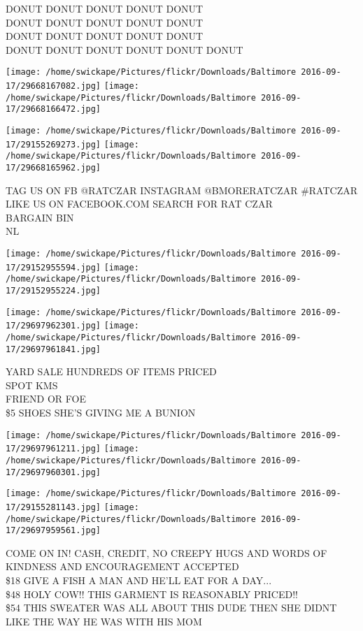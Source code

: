 \documentclass[10pt,letterpaper]{article}
\begin{document}
DONUT DONUT DONUT DONUT DONUT\\
DONUT DONUT DONUT DONUT DONUT\\
DONUT DONUT DONUT DONUT DONUT\\
DONUT DONUT DONUT DONUT DONUT DONUT\\
\pagebreak

\texttt{[image: /home/swickape/Pictures/flickr/Downloads/Baltimore 2016-09-17/29668167082.jpg]}
\texttt{[image: /home/swickape/Pictures/flickr/Downloads/Baltimore 2016-09-17/29668166472.jpg]}

\texttt{[image: /home/swickape/Pictures/flickr/Downloads/Baltimore 2016-09-17/29155269273.jpg]}
\texttt{[image: /home/swickape/Pictures/flickr/Downloads/Baltimore 2016-09-17/29668165962.jpg]}

TAG US ON FB @RATCZAR INSTAGRAM @BMORERATCZAR \#RATCZAR\\
LIKE US ON FACEBOOK.COM SEARCH FOR RAT CZAR\\
BARGAIN BIN\\
NL\\
\pagebreak

\texttt{[image: /home/swickape/Pictures/flickr/Downloads/Baltimore 2016-09-17/29152955594.jpg]}
\texttt{[image: /home/swickape/Pictures/flickr/Downloads/Baltimore 2016-09-17/29152955224.jpg]}

\texttt{[image: /home/swickape/Pictures/flickr/Downloads/Baltimore 2016-09-17/29697962301.jpg]}
\texttt{[image: /home/swickape/Pictures/flickr/Downloads/Baltimore 2016-09-17/29697961841.jpg]}

YARD SALE HUNDREDS OF ITEMS PRICED\\
SPOT KMS\\
FRIEND OR FOE\\
\$5 SHOES SHE'S GIVING ME A BUNION\\
\pagebreak

\texttt{[image: /home/swickape/Pictures/flickr/Downloads/Baltimore 2016-09-17/29697961211.jpg]}
\texttt{[image: /home/swickape/Pictures/flickr/Downloads/Baltimore 2016-09-17/29697960301.jpg]}

\texttt{[image: /home/swickape/Pictures/flickr/Downloads/Baltimore 2016-09-17/29155281143.jpg]}
\texttt{[image: /home/swickape/Pictures/flickr/Downloads/Baltimore 2016-09-17/29697959561.jpg]}

COME ON IN!  CASH, CREDIT, NO CREEPY HUGS AND WORDS OF KINDNESS AND ENCOURAGEMENT ACCEPTED\\
\$18 GIVE A FISH A MAN AND HE'LL EAT FOR A DAY...\\
\$48 HOLY COW!! THIS GARMENT IS REASONABLY PRICED!!\\
\$54 THIS SWEATER WAS ALL ABOUT THIS DUDE THEN SHE DIDNT LIKE THE WAY HE WAS WITH HIS MOM\\
\pagebreak
\end{document}
